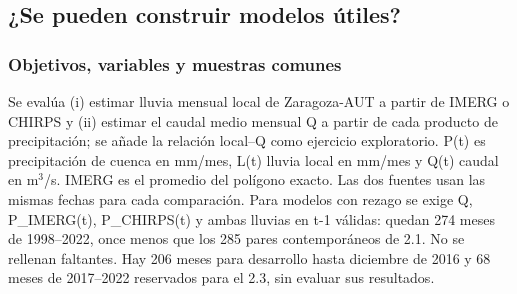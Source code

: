 \subsection{¿Se pueden construir modelos útiles?}
\subsubsection*{Objetivos, variables y muestras comunes}
Se evalúa (i) estimar lluvia mensual local de Zaragoza-AUT a partir de IMERG o CHIRPS y (ii) estimar el caudal medio mensual Q a partir de cada producto de precipitación; se añade la relación local--Q como ejercicio exploratorio. P(t) es precipitación de cuenca en mm/mes, L(t) lluvia local en mm/mes y Q(t) caudal en m$^3$/s. IMERG es el promedio del polígono exacto. Las dos fuentes usan las mismas fechas para cada comparación. Para modelos con rezago se exige Q, P\_IMERG(t), P\_CHIRPS(t) y ambas lluvias en t-1 válidas: quedan 274 meses de 1998--2022, once menos que los 285 pares contemporáneos de 2.1. No se rellenan faltantes. Hay 206 meses para desarrollo hasta diciembre de 2016 y 68 meses de 2017--2022 reservados para el 2.3, sin evaluar sus resultados.

